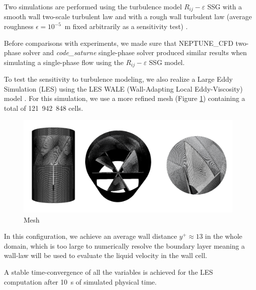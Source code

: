 \npar

Two simulations are performed using the turbulence model $R_{ij}-\varepsilon$ SSG with a smooth wall two-scale turbulent law and with a rough wall turbulent law (average roughness $\epsilon = 10^{-5}$\ m fixed arbitrarily as a sensitivity test) \cite{noauthor_code_saturne_2021}. 

\begin{note*}{}
Before comparisons with experiments, we made sure that NEPTUNE\_CFD two-phase solver and \textit{code\_saturne} single-phase solver produced similar results when simulating a single-phase flow using the $R_{ij}-\varepsilon$ SSG model.
\end{note*}



To test the sensitivity to turbulence modeling, we also realize a Large Eddy Simulation (LES) using the LES WALE (Wall-Adapting Local Eddy-Viscosity) model \cite{noauthor_code_saturne_2021}. For this simulation, we use a more refined mesh (Figure \ref{fig:prom_M4}) containing a total of 121~942~848 cells. 

%
\begin{figure}[!h]
\centering
\includegraphics[width=1.0\linewidth]{img/AGATE/prom_M4_all.png}
\caption{Mesh}
\label{fig:prom_M4}
\end{figure}
%

\npar


In this configuration, we achieve an average wall distance $y^{+} \approx 13$ in the whole domain, which is too large to numerically resolve the boundary layer meaning a wall-law will be used to evaluate the liquid velocity in the wall cell. 

\begin{note*}
A stable time-convergence of all the variables is achieved for the LES computation after 10\ s of simulated physical time.
\end{note*}

\npar

